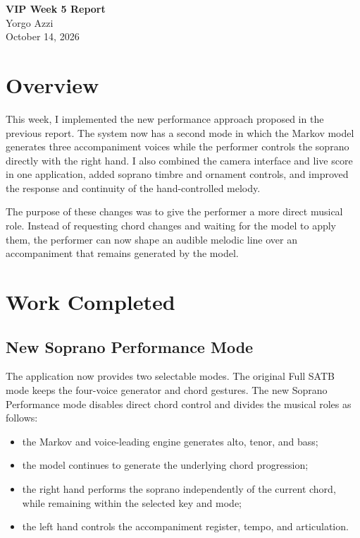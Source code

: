 \documentclass[11pt,a4paper]{article}
\begin{document}
\begin{center}
    {\Large\bfseries VIP Week 5 Report}\\[0.5em]
    {\large Yorgo Azzi}\\[0.25em]
    October 14, 2026
\end{center}

\section{Overview}

This week, I implemented the new performance approach proposed in the previous
report. The system now has a second mode in which the Markov model generates
three accompaniment voices while the performer controls the soprano directly
with the right hand. I also combined the camera interface and live score in one
application, added soprano timbre and ornament controls, and improved the
response and continuity of the hand-controlled melody.

The purpose of these changes was to give the performer a more direct musical
role. Instead of requesting chord changes and waiting for the model to apply
them, the performer can now shape an audible melodic line over an accompaniment
that remains generated by the model.

\section{Work Completed}

\subsection{New Soprano Performance Mode}

The application now provides two selectable modes. The original Full SATB mode
keeps the four-voice generator and chord gestures. The new Soprano Performance
mode disables direct chord control and divides the musical roles as follows:

\begin{itemize}
    \item the Markov and voice-leading engine generates alto, tenor, and bass;
    \item the model continues to generate the underlying chord progression;
    \item the right hand performs the soprano independently of the current
    chord, while remaining within the selected key and mode;
    \item the left hand controls the accompaniment register, tempo, and
    articulation.
\end{itemize}
\end{document}
